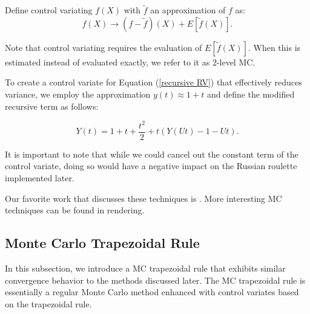 \documentclass[a4paper,12pt]{article}
\begin{document}
\begin{definition} \label{CV}
    Define control variating $f(X)$ with $\tilde{f}$ an approximation of $f$ as:
    \begin{equation}
        f(X) \rightarrow (f-\tilde{f})(X) + E[\tilde{f}(X)].
    \end{equation}

    Note that control variating requires the evaluation of
    $E[\tilde{f}(X)]$. When this is estimated instead of evaluated
    exactly, we refer to it as $2$-level MC.
\end{definition}


\begin{example} \label{ex:CV}
    To create a control variate for Equation (\ref{recursive RV}) that
    effectively reduces variance, we employ the approximation
    $y(t) \approx 1+t$ and define the modified recursive term as follows:

    \begin{equation}
        Y(t) = 1 + t + \frac{t^2}{2} + t(Y(Ut) - 1 - Ut).
    \end{equation}

    It is important to note that while we could cancel out the constant term
    of the control variate, doing so would have a negative impact on
    the Russian roulette implemented later.
\end{example}

\vspace*{0.2cm}
\begin{pythonn}
\end{pythonn}

\begin{related}[MC modification]
    Our favorite work that discusses these techniques is \cite{veach_robust_1997}.
    More interesting MC techniques can be found in rendering.
\end{related}

\subsection{Monte Carlo Trapezoidal Rule}

In this subsection, we introduce a MC trapezoidal rule that
exhibits similar convergence behavior to the methods discussed later.
The MC trapezoidal rule is essentially a regular Monte Carlo method
enhanced with control variates based on the trapezoidal rule.
\end{document}
